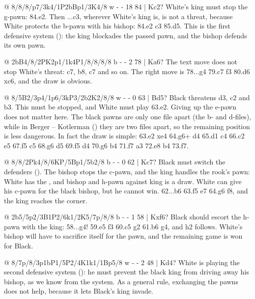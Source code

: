 @ 8/8/8/p7/3k4/1P2bBp1/3K4/8 w - - 18 84 | Kc2?
White's king must stop the g-pawn: 84.\K e2. Then ...\K c3, wherever White's king is, is not a
threat, because White protects the b-pawn with his bishop: 84.\K e2 \K c3 85.\B d5. This is the first
defensive system ():
the king blockades the passed pawn, and the bishop defends its own pawn.

@ 2bB4/8/2PK2p1/1k4P1/8/8/8/8 b - - 2 78 | Ka6?
The text move does not stop White's threat: \K c7, \K b8, c7 and so on. The right move is
78...\B g4 79.\K c7 \B f3 80.\K d6 \B xc6, and the draw is obvious.

@ 8/5B2/3p4/1p6/3kP3/2b2K2/8/8 w - - 0 63 | Bd5?
Black threatens \K d3, \K c2 and b3. This must be stopped, and White must play 63.\K e2. Giving up the e-pawn does not matter here. The black pawns are only one file apart (the b- and d-files), while in Berger -- Kotlerman () they are two files apart, so the remaining position is less dangerous. In fact the draw is simple: 63.\K e2 \K xe4 64.\B g6+ \K d4 65.\K d1 \K c4 66.\K c2 \B e5 67.\B f5 \K c5 68.\B g6 d5 69.\B f5 d4 70.\B g6 \K b4 71.\B f7 \K a3 72.\B e8 b4 73.\B f7.

@ 8/8/2Pk4/8/6KP/5Bp1/5b2/8 b - - 0 62 | Kc7?
Black must switch the defenders (). The bishop stops the c-pawn, and the king handles the rook's pawn: White has the , and bishop and h-pawn against king is a draw. White can give his c-pawn for the black bishop, but he cannot win. 62...\B b6 63.\K f5 \K e7 64.\K g6 \K f8, and the king reaches the corner.

@ 2b5/5p2/3B1P2/6k1/2K5/7p/8/8 b - - 1 58 | Kxf6?
Black should escort the h-pawn with the king: 58...\K g4! 59.\B e5 \K f3 60.\K c5 \K g2 61.\K b6 \B g4, and h2 follows. White's bishop will have to sacrifice itself for the pawn, and the remaining game is won for Black.

@ 8/7p/8/3p1bP1/5P2/4K1k1/1Bp5/8 w - - 2 48 | Kd4?
White is playing the second defensive system (): he must prevent the black king from driving away his bishop, as we know from the system. As a general rule, exchanging the pawns does not help, because it lets Black's king invade.

